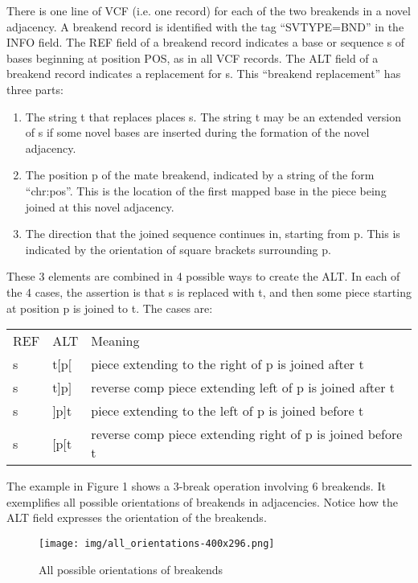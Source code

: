 \documentclass[8pt]{article}
\begin{document}
There is one line of VCF (i.e. one record) for each of the two breakends in a novel adjacency. A breakend record is identified with the tag ``SVTYPE=BND'' in the INFO field. The REF field of a breakend record indicates a base or sequence s of bases beginning at position POS, as in all VCF records. The ALT field of a breakend record indicates a replacement for s. This ``breakend replacement'' has three parts:
\begin{enumerate}
  \item The string t that replaces places s. The string t may be an extended version of s if some novel bases are inserted during the formation of the novel adjacency.
  \item The position p of the mate breakend, indicated by a string of the form ``chr:pos''. This is the location of the first mapped base in the piece being joined at this novel adjacency.
  \item The direction that the joined sequence continues in, starting from p. This is indicated by the orientation of square brackets surrounding p.

\end{enumerate}
These 3 elements are combined in 4 possible ways to create the ALT. In each of the 4 cases, the assertion is that s is replaced with t, and then some piece starting at position p is joined to t. The cases are:

\vspace{0.3cm}
\begin{tabular}{ l l l }
REF & ALT & Meaning \\
s & t$[$p$[$ & piece extending to the right of p is joined after t \\
s & t$]$p$]$ & reverse comp piece extending left of p is joined after t \\
s & $]$p$]$t & piece extending to the left of p is joined before t \\
s & $[$p$[$t & reverse comp piece extending right of p is joined before t \\
\end{tabular}
\vspace{0.3cm}

The example in Figure 1 shows a 3-break operation involving 6 breakends. It exemplifies all possible orientations of breakends in adjacencies. Notice how the ALT field expresses the orientation of the breakends.

\begin{figure}[ht]
\centering
\texttt{[image: img/all\_orientations-400x296.png]}
\caption{All possible orientations of breakends}
\end{figure}
\end{document}

